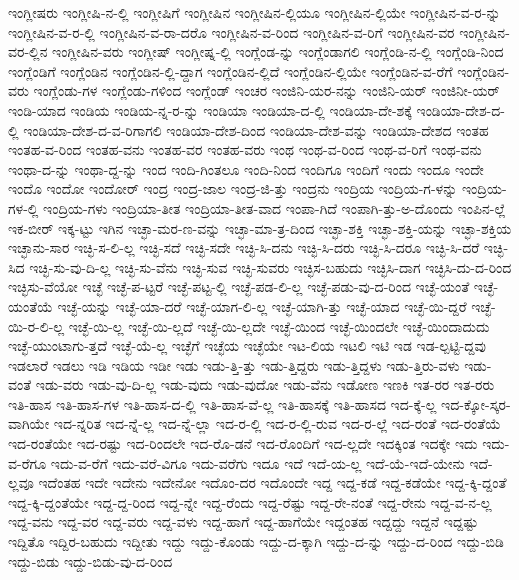 {ಇಂಗ್ಲೀಷರು
ಇಂಗ್ಲೀಷಿ-ನ-ಲ್ಲಿ
ಇಂಗ್ಲೀಷಿಗೆ
ಇಂಗ್ಲೀಷಿನ
ಇಂಗ್ಲೀಷಿನ-ಲ್ಲಿಯೂ
ಇಂಗ್ಲೀಷಿನ-ಲ್ಲಿಯೇ
ಇಂಗ್ಲೀಷಿನ-ವ-ರ-ನ್ನು
ಇಂಗ್ಲೀಷಿನ-ವ-ರ-ಲ್ಲಿ
ಇಂಗ್ಲೀಷಿನ-ವ-ರಾ-ದರೊ
ಇಂಗ್ಲೀಷಿನ-ವ-ರಿಂದ
ಇಂಗ್ಲೀಷಿನ-ವ-ರಿಗೆ
ಇಂಗ್ಲೀಷಿನ-ವರ
ಇಂಗ್ಲೀಷಿನ-ವರ-ಲ್ಲಿನ
ಇಂಗ್ಲೀಷಿನ-ವರು
ಇಂಗ್ಲೀಷ್
ಇಂಗ್ಲೀಷ್ನ-ಲ್ಲಿ
ಇಂಗ್ಲೆಂಡ-ನ್ನು
ಇಂಗ್ಲೆಂಡಾಗಲಿ
ಇಂಗ್ಲೆಂಡಿ-ನ-ಲ್ಲಿ
ಇಂಗ್ಲೆಂಡಿ-ನಿಂದ
ಇಂಗ್ಲೆಂಡಿಗೆ
ಇಂಗ್ಲೆಂಡಿನ
ಇಂಗ್ಲೆಂಡಿನ-ಲ್ಲಿ-ದ್ದಾಗ
ಇಂಗ್ಲೆಂಡಿನ-ಲ್ಲಿದೆ
ಇಂಗ್ಲೆಂಡಿನ-ಲ್ಲಿಯೇ
ಇಂಗ್ಲೆಂಡಿನ-ವ-ರೆಗೆ
ಇಂಗ್ಲೆಂಡಿನ-ವರು
ಇಂಗ್ಲೆಂಡು-ಗಳ
ಇಂಗ್ಲೆಂಡು-ಗಳಿಂದ
ಇಂಗ್ಲೆಂಡ್
ಇಂಚರ
ಇಂಜಿನಿ-ಯರ-ನನ್ನು
ಇಂಜಿನಿ-ಯರ್
ಇಂಜಿನೀ-ಯರ್
ಇಂಡಿ-ಯಾದ
ಇಂಡಿಯ
ಇಂಡಿಯ-ನ್ನ-ರ-ನ್ನು
ಇಂಡಿಯಾ
ಇಂಡಿಯಾ-ದ-ಲ್ಲಿ
ಇಂಡಿಯಾ-ದೇ-ಶಕ್ಕೆ
ಇಂಡಿಯಾ-ದೇಶ-ದ-ಲ್ಲಿ
ಇಂಡಿಯಾ-ದೇಶ-ದ-ವ-ರಿಗಾಗಲಿ
ಇಂಡಿಯಾ-ದೇಶ-ದಿಂದ
ಇಂಡಿಯಾ-ದೇಶ-ವನ್ನು
ಇಂಡಿಯಾ-ದೇಶದ
ಇಂತಹ
ಇಂತಹ-ವ-ರಿಂದ
ಇಂತಹ-ವನು
ಇಂತಹ-ವರ
ಇಂತಹ-ವರು
ಇಂಥ
ಇಂಥ-ವ-ರಿಂದ
ಇಂಥ-ವ-ರಿಗೆ
ಇಂಥ-ವನು
ಇಂಥಾ-ದ-ನ್ನು
ಇಂಥಾ-ದ್ದ-ನ್ನು
ಇಂದ
ಇಂದಿ-ಗಿಂತಲೂ
ಇಂದಿ-ನಿಂದ
ಇಂದಿಗೂ
ಇಂದಿಗೆ
ಇಂದು
ಇಂದೂ
ಇಂದೇ
ಇಂದೊ
ಇಂದೋ
ಇಂದೋರ್
ಇಂದ್ರ
ಇಂದ್ರ-ಜಾಲ
ಇಂದ್ರ-ಜಿ-ತ್ತು
ಇಂದ್ರನು
ಇಂದ್ರಿಯ
ಇಂದ್ರಿಯ-ಗ-ಳನ್ನು
ಇಂದ್ರಿಯ-ಗಳ-ಲ್ಲಿ
ಇಂದ್ರಿಯ-ಗಳು
ಇಂದ್ರಿಯಾ-ತೀತ
ಇಂದ್ರಿಯಾ-ತೀತ-ವಾದ
ಇಂಪಾ-ಗಿದೆ
ಇಂಪಾಗಿ-ತ್ತು-ಅ-ದೊಂದು
ಇಂಪಿನ-ಲ್ಲೆ
ಇಕ-ಬೀರ್
ಇಕ್ಕ-ಟ್ಟು
ಇಗಿನ
ಇಚ್ಛಾ-ಮರ-ಣ-ವನ್ನು
ಇಚ್ಛಾ-ಮಾ-ತ್ರ-ದಿಂದ
ಇಚ್ಛಾ-ಶಕ್ತಿ
ಇಚ್ಛಾ-ಶಕ್ತಿ-ಯನ್ನು
ಇಚ್ಛಾ-ಶಕ್ತಿಯ
ಇಚ್ಛಾನು-ಸಾರ
ಇಚ್ಛಿ-ಸ-ಲಿ-ಲ್ಲ
ಇಚ್ಛಿ-ಸದೆ
ಇಚ್ಛಿ-ಸದೇ
ಇಚ್ಛಿ-ಸಿ-ದನು
ಇಚ್ಛಿ-ಸಿ-ದರು
ಇಚ್ಛಿ-ಸಿ-ದರೂ
ಇಚ್ಛಿ-ಸಿ-ದರೆ
ಇಚ್ಛಿ-ಸಿದ
ಇಚ್ಛಿ-ಸು-ವು-ದಿ-ಲ್ಲ
ಇಚ್ಛಿ-ಸು-ವೆನು
ಇಚ್ಛಿ-ಸುವ
ಇಚ್ಛಿ-ಸುವರು
ಇಚ್ಛಿಸ-ಬಹುದು
ಇಚ್ಛಿಸಿ-ದಾಗ
ಇಚ್ಛಿಸಿ-ದು-ದ-ರಿಂದ
ಇಚ್ಛಿಸು-ವೆಯೋ
ಇಚ್ಛೆ
ಇಚ್ಛೆ-ಪ-ಟ್ಟರೆ
ಇಚ್ಛೆ-ಪಟ್ಟ-ಲ್ಲಿ
ಇಚ್ಛೆ-ಪಡ-ಲಿ-ಲ್ಲ
ಇಚ್ಛೆ-ಪಡು-ವು-ದ-ರಿಂದ
ಇಚ್ಛೆ-ಯಂತೆ
ಇಚ್ಛೆ-ಯಂತೆಯೆ
ಇಚ್ಛೆ-ಯನ್ನು
ಇಚ್ಛೆ-ಯಾ-ದರೆ
ಇಚ್ಛೆ-ಯಾಗ-ಲಿ-ಲ್ಲ
ಇಚ್ಛೆ-ಯಾಗಿ-ತ್ತು
ಇಚ್ಛೆ-ಯಾದ
ಇಚ್ಛೆ-ಯಿ-ದ್ದರೆ
ಇಚ್ಛೆ-ಯಿ-ರ-ಲಿ-ಲ್ಲ
ಇಚ್ಛೆ-ಯಿ-ಲ್ಲ
ಇಚ್ಛೆ-ಯಿ-ಲ್ಲದೆ
ಇಚ್ಛೆ-ಯಿ-ಲ್ಲದೇ
ಇಚ್ಛೆ-ಯಿಂದ
ಇಚ್ಛೆ-ಯಿಂದಲೇ
ಇಚ್ಛೆ-ಯಿಂದಾದುದು
ಇಚ್ಛೆ-ಯುಂಟಾಗು-ತ್ತದೆ
ಇಚ್ಛೆ-ಯೆ-ಲ್ಲ
ಇಚ್ಛೆಗೆ
ಇಚ್ಛೆಯ
ಇಚ್ಛೆಯೇ
ಇಟ-ಲಿಯ
ಇಟಲಿ
ಇಟಿ
ಇಡ
ಇಡ-ಲ್ಪಟ್ಟಿ-ದ್ದವು
ಇಡಲಾರೆ
ಇಡಲು
ಇಡಿ
ಇಡಿಯ
ಇಡೀ
ಇಡು
ಇಡು-ತ್ತಿ-ತ್ತು
ಇಡು-ತ್ತಿದ್ದರು
ಇಡು-ತ್ತಿದ್ದಳು
ಇಡು-ತ್ತಿರು-ವಳು
ಇಡು-ವಂತೆ
ಇಡು-ವರು
ಇಡು-ವು-ದಿ-ಲ್ಲ
ಇಡು-ವುದು
ಇಡು-ವುದೋ
ಇಡು-ವೆನು
ಇಡೋಣ
ಇಣಕಿ
ಇತ-ರರ
ಇತ-ರರು
ಇತಿ-ಹಾಸ
ಇತಿ-ಹಾಸ-ಗಳ
ಇತಿ-ಹಾಸ-ದ-ಲ್ಲಿ
ಇತಿ-ಹಾಸ-ವೆ-ಲ್ಲ
ಇತಿ-ಹಾಸಕ್ಕೆ
ಇತಿ-ಹಾಸದ
ಇದ-ಕ್ಕೆ-ಲ್ಲ
ಇದ-ಕ್ಕೋ-ಸ್ಕರ-ವಾಗಿಯೇ
ಇದ-ನ್ನರಿತ
ಇದ-ನ್ನೆ-ಲ್ಲ
ಇದ-ನ್ನೆ-ಲ್ಲಾ
ಇದ-ರ-ಲ್ಲಿ
ಇದ-ರ-ಲ್ಲಿ-ರುವ
ಇದ-ರ-ಲ್ಲೆ
ಇದ-ರಂತೆ
ಇದ-ರಂತೆಯೆ
ಇದ-ರಂತೆಯೇ
ಇದ-ರಷ್ಟು
ಇದ-ರಿಂದಲೇ
ಇದ-ರೊ-ಡನೆ
ಇದ-ರೊಂದಿಗೆ
ಇದ-ಲ್ಲದೇ
ಇದಕ್ಕಿಂತ
ಇದಕ್ಕೇ
ಇದು
ಇದು-ವ-ರೆಗೂ
ಇದು-ವ-ರೆಗೆ
ಇದು-ವರೆ-ವಿಗೂ
ಇದು-ವರೆಗು
ಇದೂ
ಇದೆ
ಇದೆ-ಯ-ಲ್ಲ
ಇದೆ-ಯೆ-ಇದೆ-ಯೇನು
ಇದೆ-ಲ್ಲವೂ
ಇದೆಂತಹ
ಇದೇ
ಇದೇನು
ಇದೇನೋ
ಇದೊಂ-ದರ
ಇದೊಂದೇ
ಇದ್ದ
ಇದ್ದ-ಕಡೆ
ಇದ್ದ-ಕಡೆಯೇ
ಇದ್ದ-ಕ್ಕಿ-ದ್ದಂತೆ
ಇದ್ದ-ಕ್ಕಿ-ದ್ದಂತೆಯೇ
ಇದ್ದ-ದ್ದ-ರಿಂದ
ಇದ್ದ-ನ್ನೇ
ಇದ್ದ-ರೆಂದು
ಇದ್ದ-ರೆಷ್ಟು
ಇದ್ದ-ರೇ-ನಂತೆ
ಇದ್ದ-ರೇನು
ಇದ್ದ-ವ-ನ-ಲ್ಲ
ಇದ್ದ-ವನು
ಇದ್ದ-ವರ
ಇದ್ದ-ವರು
ಇದ್ದ-ವಳು
ಇದ್ದ-ಹಾಗೆ
ಇದ್ದ-ಹಾಗೆಯೇ
ಇದ್ದಂತಹ
ಇದ್ದದ್ದು
ಇದ್ದನೆ
ಇದ್ದಷ್ಟು
ಇದ್ದಿತೊ
ಇದ್ದಿರ-ಬಹುದು
ಇದ್ದೀತು
ಇದ್ದು
ಇದ್ದು-ಕೊಂಡು
ಇದ್ದು-ದ-ಕ್ಕಾಗಿ
ಇದ್ದು-ದ-ನ್ನು
ಇದ್ದು-ದ-ರಿಂದ
ಇದ್ದು-ಬಿಡಿ
ಇದ್ದು-ಬಿಡು
ಇದ್ದು-ಬಿಡು-ವು-ದ-ರಿಂದ
}
